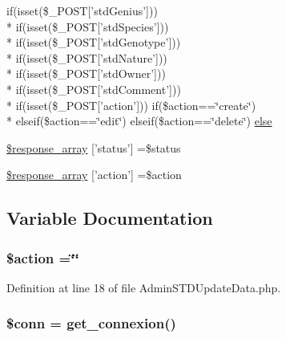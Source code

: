 \begin{DoxyCompactItemize}
if(isset(\$\-\_\-\-P\-O\-S\-T\mbox{[}'std\-Genius'\mbox{]})) \\*
if(isset(\$\-\_\-\-P\-O\-S\-T\mbox{[}'std\-Species'\mbox{]})) \\*
if(isset(\$\-\_\-\-P\-O\-S\-T\mbox{[}'std\-Genotype'\mbox{]})) \\*
if(isset(\$\-\_\-\-P\-O\-S\-T\mbox{[}'std\-Nature'\mbox{]})) \\*
if(isset(\$\-\_\-\-P\-O\-S\-T\mbox{[}'std\-Owner'\mbox{]})) \\*
if(isset(\$\-\_\-\-P\-O\-S\-T\mbox{[}'std\-Comment'\mbox{]})) \\*
if(isset(\$\-\_\-\-P\-O\-S\-T\mbox{[}'action'\mbox{]})) if(\$action==\char`\"{}create\char`\"{}) \\*
elseif(\$action==\char`\"{}edit\char`\"{}) elseif(\$action==\char`\"{}delete\char`\"{}) \hyperlink{_admin_s_t_d_update_data_8php_ac39ffa0dfdb937b45fe1b6df63ed5191}{else}
\item 
\hyperlink{_admin_s_t_d_update_data_8php_acd0903a7a32e8397aefd0ce8b7dbd1ab}{\$response\-\_\-array} \mbox{[}'status'\mbox{]} =\$status
\item 
\hyperlink{_admin_s_t_d_update_data_8php_ae768978a0cdc416c0d63d798c85c8784}{\$response\-\_\-array} \mbox{[}'action'\mbox{]} =\$action
\end{DoxyCompactItemize}


\subsection{Variable Documentation}
\hypertarget{_admin_s_t_d_update_data_8php_aa698a3e72116e8e778be0e95d908ee30}{
\subsubsection[{\$action}]{\setlength{\rightskip}{0pt plus 5cm}\$action =\char`\"{}\char`\"{}}}\label{_admin_s_t_d_update_data_8php_aa698a3e72116e8e778be0e95d908ee30}


Definition at line 18 of file Admin\-S\-T\-D\-Update\-Data.\-php.

\hypertarget{_admin_s_t_d_update_data_8php_aa8a5a87b9c1a6a0819b88447cbe41877}{
\subsubsection[{\$conn}]{\setlength{\rightskip}{0pt plus 5cm}\$conn = {\bf get\-\_\-connexion}()}}\label{_admin_s_t_d_update_data_8php_aa8a5a87b9c1a6a0819b88447cbe41877}


